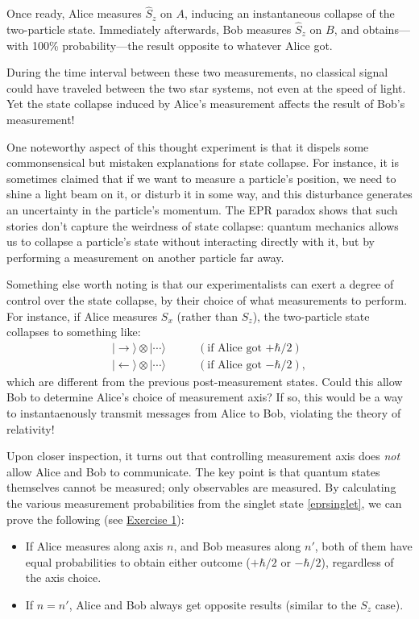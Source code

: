\documentclass[pra,12pt]{revtex4-2}
\begin{document}
Once ready, Alice measures $\hat{S}_z$ on $A$, inducing an
instantaneous collapse of the two-particle state.  Immediately
afterwards, Bob measures $\hat{S}_z$ on $B$, and obtains---with 100\%
probability---the result opposite to whatever Alice got.

During the time interval between these two measurements, no classical
signal could have traveled between the two star systems, not even at
the speed of light.  Yet the state collapse induced by Alice's
measurement affects the result of Bob's measurement!

One noteworthy aspect of this thought experiment is that it dispels
some commonsensical but mistaken explanations for state collapse.  For
instance, it is sometimes claimed that if we want to measure a
particle's position, we need to shine a light beam on it, or disturb
it in some way, and this disturbance generates an uncertainty in the
particle's momentum.  The EPR paradox shows that such stories don't
capture the weirdness of state collapse: quantum mechanics allows us
to collapse a particle's state without interacting directly with it,
but by performing a measurement on another particle far away.

Something else worth noting is that our experimentalists can exert a
degree of control over the state collapse, by their choice of what
measurements to perform.  For instance, if Alice measures $S_x$
(rather than $S_z$), the two-particle state collapses to something
like:
\begin{align*}
  |\!\rightarrow\rangle \otimes |\cdots\rangle &\qquad(\textrm{if Alice got $+\hbar/2$}) \\
  |\!\leftarrow\rangle \otimes |\cdots\rangle &\qquad(\textrm{if Alice got $-\hbar/2$}),
\end{align*}
which are different from the previous post-measurement states.  Could
this allow Bob to determine Alice's choice of measurement axis?  If
so, this would be a way to instantaenously transmit messages from
Alice to Bob, violating the theory of relativity!

Upon closer inspection, it turns out that controlling measurement axis
does \textit{not} allow Alice and Bob to communicate.  The key point
is that quantum states themselves cannot be measured; only observables
are measured.  By calculating the various measurement probabilities
from the singlet state \eqref{eprsinglet}, we can prove the following
(see \hyperref[ex:singletproperties]{Exercise 1}):

\begin{itemize}
\item
  If Alice measures along axis $n$, and Bob measures along $n'$, both
  of them have equal probabilities to obtain either outcome
  ($+\hbar/2$ or $-\hbar/2$), regardless of the axis choice.

\item If $n = n'$, Alice and Bob always get opposite results (similar
  to the $S_z$ case).
\end{itemize}
\end{document}
